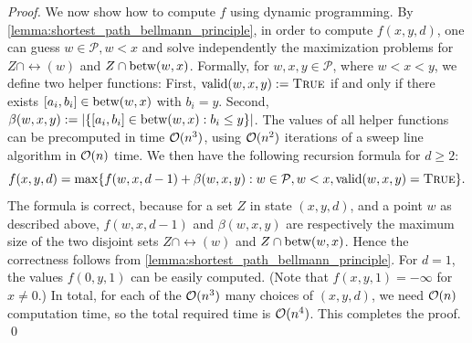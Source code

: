 \begin{proof}
We now show how to compute $f$ using dynamic programming. By \cref{lemma:shortest_path_bellmann_principle}, in order to compute $f(x,y,d)$, one can guess $w \in \mathcal{P}, w < x$ and solve independently the maximization problems for $Z \cap \rel(w)$ and $Z \cap \operatorname{\text{betw}}(w,x)$. Formally, for $w,x,y \in \mathcal{P}$, where $w < x < y$, we define two helper functions: First, $\operatorname{\text{valid}}(w,x,y) := \textsc{True}$ if and only if there exists $[a_i, b_i] \in \operatorname{\text{betw}}(w,x)$ with $b_i = y$. Second, $\beta(w,x,y) := |\{ [a_i, b_i] \in \operatorname{\text{betw}}(w,x) : b_i \leq y \}|$. The values of all helper functions can be precomputed in time $\mathcal{O}(n^3)$, using $\mathcal{O}(n^2)$ iterations of a sweep line algorithm in $\mathcal{O}(n)$ time.
We then have the following recursion formula for $d \geq 2$:
\[f(x,y,d) = \max\{ f(w,x,d-1) + \beta(w,x,y) : w \in \mathcal{P}, w < x, \operatorname{\text{valid}}(w,x,y) = \textsc{True} \}.
\]
The formula is correct, because for a set $Z$ in state $(x, y, d)$, and a point $w$ as described above, $f(w, x, d-1)$ and $\beta(w, x, y)$ are respectively the maximum size of the two disjoint sets $Z \cap \rel(w)$ and $Z \cap \operatorname{\text{betw}}(w, x)$.
Hence the correctness follows from \cref{lemma:shortest_path_bellmann_principle}.
For $d = 1$, the values $f(0, y, 1)$ can be easily computed. (Note that $f(x,y,1) = -\infty$ for $x \neq 0$.) In total, for each of the $\mathcal{O}(n^3)$ many choices of $(x, y, d)$, we need $\mathcal{O}(n)$ computation time, so the total required time is $\mathcal{O}(n^4)$. This completes the proof.
\qed\end{proof}


